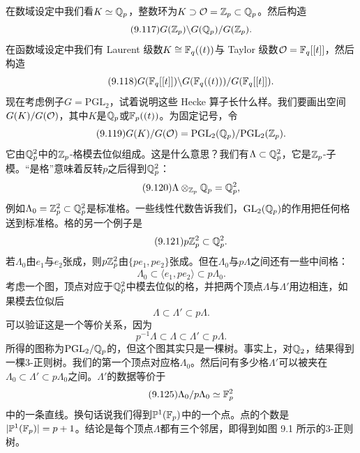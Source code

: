 在数域设定中我们看$K\simeq\mathbb{Q}_p$，整数环为$K\supset\mathcal{O}=\mathbb{Z}_p\subset\mathbb{Q}_p$。然后构造
\begin{equation}\tag{9.117}
G(\mathbb{Z}_p)\backslash G(\mathbb{Q}_p)/G(\mathbb{Z}_p).
\end{equation}
在函数域设定中我们有 Laurent 级数$K\cong\mathbb{F}_q((t))$与 Taylor 级数$\mathcal{O}=\mathbb{F}_q[[t]]$，然后构造
\begin{equation}\tag{9.118}
G(\mathbb{F}_q[[t]])\backslash G(\mathbb{F}_q((t)))/G(\mathbb{F}_q[[t]]).
\end{equation}
现在考虑例子$G=\mathrm{PGL}_2$，试着说明这些 Hecke 算子长什么样。我们要画出空间$G(K)/G(\mathcal{O})$，其中$K$是$\mathbb{Q}_p$或$\mathbb{F}_p((t))$。为固定记号，令
\begin{equation}\tag{9.119}
G(K)/G(\mathcal{O})=\mathrm{PGL}_2(\mathbb{Q}_p)/\mathrm{PGL}_2(\mathbb{Z}_p).
\end{equation}
它由$\mathbb{Q}_p^{2}$中的$\mathbb{Z}_p$-格模去位似组成。这是什么意思？我们有$\Lambda\subset\mathbb{Q}_p^{2}$，它是$\mathbb{Z}_p$-子模。“是格”意味着反转$p$之后得到$\mathbb{Q}_p^{2}$：
\begin{equation}\tag{9.120}
\Lambda\otimes_{\mathbb{Z}_p}\mathbb{Q}_p=\mathbb{Q}_p^{2},
\end{equation}
例如$\Lambda_0=\mathbb{Z}_p^{2}\subset\mathbb{Q}_p^{2}$是标准格。一些线性代数告诉我们，$\mathrm{GL}_2(\mathbb{Q}_p)$的作用把任何格送到标准格。格的另一个例子是
\begin{equation}\tag{9.121}
p\mathbb{Z}_p^{2}\subset\mathbb{Q}_p^{2}.
\end{equation}
若$\Lambda_0$由$e_1$与$e_2$张成，则$p\mathbb{Z}_p^{2}$由$\{pe_1,pe_2\}$张成。但在$\Lambda_0$与$p\Lambda$之间还有一些中间格：
\begin{equation}\tag{9.122}
\Lambda_0\subset\langle e_1,pe_2\rangle\subset p\Lambda_0.
\end{equation}
考虑一个图，顶点对应于$\mathbb{Q}_p^{2}$中模去位似的格，并把两个顶点$\Lambda$与$\Lambda'$用边相连，如果模去位似后
\begin{equation}\tag{9.123}
\Lambda\subset\Lambda'\subset p\Lambda.
\end{equation}
可以验证这是一个等价关系，因为
\begin{equation}\tag{9.124}
p^{-1}\Lambda\subset\Lambda\subset\Lambda'\subset p\Lambda.
\end{equation}
所得的图称为$\mathrm{PGL}_2/\mathbb{Q}_p$的，但这个图其实只是一棵树。事实上，对$\mathbb{Q}_2$，结果得到一棵$3$-正则树。我们的第一个顶点对应格$\Lambda_0$。然后问有多少格$\Lambda'$可以被夹在$\Lambda_0\subset\Lambda'\subset p\Lambda_0$之间。$\Lambda'$的数据等价于
\begin{equation}\tag{9.125}
\Lambda_0/p\Lambda_0\simeq\mathbb{F}_p^{2}
\end{equation}
中的一条直线。换句话说我们得到$\mathbb{P}^{1}(\mathbb{F}_p)$中的一个点。点的个数是$|\mathbb{P}^{1}(\mathbb{F}_p)|=p+1$。结论是每个顶点$\Lambda$都有三个邻居，即得到如图 9.1 所示的$3$-正则树。


